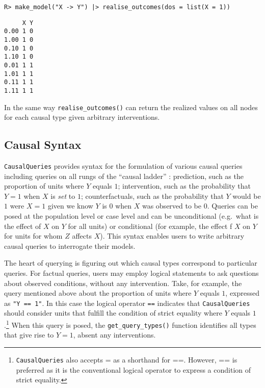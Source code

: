 \documentclass[
  11pt,
  article]{jss}
\begin{document}
\begin{verbatim}
R> make_model("X -> Y") |> realise_outcomes(dos = list(X = 1))
\end{verbatim}

\begin{verbatim}
     X Y
0.00 1 0
1.00 1 0
0.10 1 0
1.10 1 0
0.01 1 1
1.01 1 1
0.11 1 1
1.11 1 1
\end{verbatim}

In the same way \texttt{realise\_outcomes()} can return the realized
values on all nodes for each causal type given arbitrary interventions.

\hypertarget{sec-syntax}{%
\subsection{Causal Syntax}\label{sec-syntax}}

\texttt{CausalQueries} provides syntax for the formulation of various
causal queries including queries on all rungs of the ``causal ladder''
\citep{pearl_causality_2009}: prediction, such as the proportion of
units where \(Y\) equals \(1\); intervention, such as the probability
that \(Y = 1\) when \(X\) is \emph{set} to \(1\); counterfactuals, such
as the probability that \(Y\) would be \(1\) were \(X = 1\) given we
know \(Y\) is \(0\) when \(X\) was observed to be \(0\). Queries can be
posed at the population level or case level and can be unconditional
(e.g.~what is the effect of \(X\) on \(Y\) for all units) or conditional
(for example, the effect f \(X\) on \(Y\) for units for whom \(Z\)
affects \(X\)). This syntax enables users to write arbitrary causal
queries to interrogate their models.

The heart of querying is figuring out which causal types correspond to
particular queries. For factual queries, users may employ logical
statements to ask questions about observed conditions, without any
intervention. Take, for example, the query mentioned above about the
proportion of units where \(Y\) equals \(1\), expressed as
\texttt{"Y\ ==\ 1"}. In this case the logical operator \texttt{==}
indicates that \texttt{CausalQueries} should consider units that fulfill
the condition of strict equality where \(Y\) equals \(1\).\footnote{\texttt{CausalQueries}
  also accepts = as a shorthand for ==. However, == is preferred as it
  is the conventional logical operator to express a condition of strict
  equality.} When this query is posed, the \texttt{get\_query\_types()}
function identifies all types that give rise to \(Y=1\), absent any
interventions.
\end{document}
